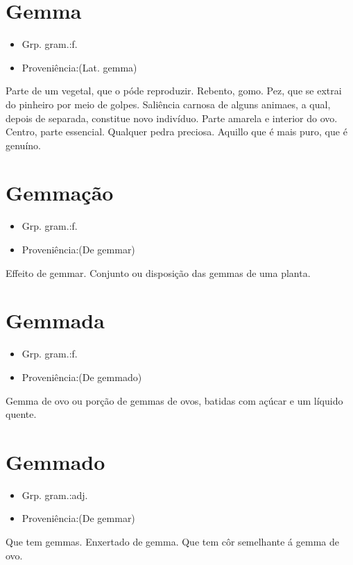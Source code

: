 \section{Gemma}
\begin{itemize}
\item {Grp. gram.:f.}
\end{itemize}
\begin{itemize}
\item {Proveniência:(Lat. \textunderscore gemma\textunderscore )}
\end{itemize}
Parte de um vegetal, que o póde reproduzir.
Rebento, gomo.
Pez, que se extrai do pinheiro por meio de golpes.
Saliência carnosa de alguns animaes, a qual, depois de separada, constitue novo indivíduo.
Parte amarela e interior do ovo.
Centro, parte essencial.
Qualquer pedra preciosa.
Aquillo que é mais puro, que é genuíno.
\section{Gemmação}
\begin{itemize}
\item {Grp. gram.:f.}
\end{itemize}
\begin{itemize}
\item {Proveniência:(De \textunderscore gemmar\textunderscore )}
\end{itemize}
Effeito de gemmar.
Conjunto ou disposição das gemmas de uma planta.
\section{Gemmada}
\begin{itemize}
\item {Grp. gram.:f.}
\end{itemize}
\begin{itemize}
\item {Proveniência:(De \textunderscore gemmado\textunderscore )}
\end{itemize}
Gemma de ovo ou porção de gemmas de ovos, batidas com açúcar e um líquido quente.
\section{Gemmado}
\begin{itemize}
\item {Grp. gram.:adj.}
\end{itemize}
\begin{itemize}
\item {Proveniência:(De \textunderscore gemmar\textunderscore )}
\end{itemize}
Que tem gemmas.
Enxertado de gemma.
Que tem côr semelhante á gemma de ovo.
